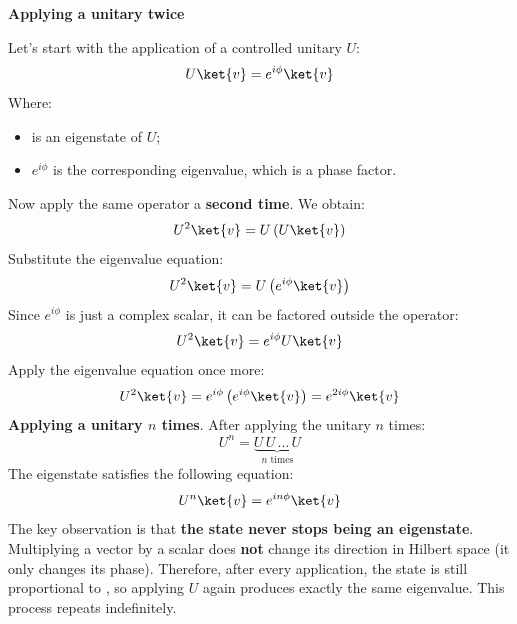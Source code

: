 \highspace
\begin{flushleft}
    \textcolor{Green3}{ \textbf{Applying a unitary twice}}
\end{flushleft}
Let's start with the application of a controlled unitary $U$:
\begin{equation*}
    U\ket{v} = e^{i \phi} \ket{v}
\end{equation*}
Where:
\begin{itemize}
    \item {} is an eigenstate of $U$;
    \item $e^{i \phi}$ is the corresponding eigenvalue, which is a phase factor.
\end{itemize}
Now apply the same operator a \textbf{second time}. We obtain:
\begin{equation*}
    U^2 \ket{v} = U \left(U \ket{v}\right)
\end{equation*}
Substitute the eigenvalue equation:
\begin{equation*}
    U^2 \ket{v} = U \left(e^{i \phi} \ket{v}\right)
\end{equation*}
Since $e^{i \phi}$ is just a complex scalar, it can be factored outside the operator:
\begin{equation*}
    U^2 \ket{v} = e^{i \phi} U \ket{v}
\end{equation*}
Apply the eigenvalue equation once more:
\begin{equation*}
    U^2 \ket{v} = e^{i \phi} \left(e^{i \phi} \ket{v}\right) = e^{2 i \phi} \ket{v}
\end{equation*}
\textcolor{Green3}{ \textbf{Applying a unitary $n$ times}}. After applying the unitary $n$ times:
\begin{equation*}
    U^n = \underbrace{U \, U \, \dots \, U}_{n \text{ times}}
\end{equation*}
The eigenstate satisfies the following equation:
\begin{equation}
    U^n \ket{v} = e^{i n \phi} \ket{v}
\end{equation}
The key observation is that \textbf{the state never stops being an eigenstate}. Multiplying a vector by a scalar does \textbf{not} change its direction in Hilbert space (it only changes its phase). Therefore, after every application, the state is still proportional to , so applying $U$ again produces exactly the same eigenvalue. This process repeats indefinitely.

